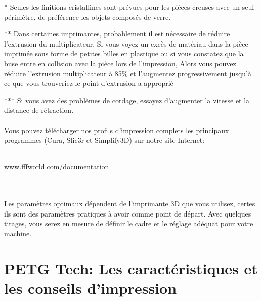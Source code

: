 \documentclass[11pt,a4paper]{article}
\begin{document}
* Seules les finitions cristallines sont prévues pour les pièces creuses avec un seul périmètre, de préférence les objets composés de verre.

** Dans certaines imprimantes, probablement il est nécessaire de réduire l’extrusion du multiplicateur. Si vous voyez un excès de matériau dans la pièce imprimée sous forme de petites billes en plastique ou si vous constatez que la buse entre en collision avec la pièce lors de l’impression, Alors vous pouvez  réduire l’extrusion multiplicateur à 85\% et l’augmentez progressivement jusqu'à ce que vous trouveriez le point d’extrusion a approprié

*** Si vous avez des problèmes de cordage, essayez d'augmenter la vitesse et la distance de  rétraction.
\\\\
Vous pouvez télécharger nos profils d’impression complets les principaux programmes (Cura, Slic3r et Simplify3D) sur notre site Internet:
\\\\
\centerline{ {\huge \url{www.fffworld.com/documentation} } }
\\\\
Les paramètres optimaux dépendent de l’imprimante 3D que vous utilisez, certes ils sont des paramètres pratiques à avoir comme point de départ. Avec quelques tirages, vous serez en mesure de définir  le cadre et le réglage adéquat pour votre machine.
\section{PETG Tech: Les caractéristiques et les conseils d’impression}
\end{document}
